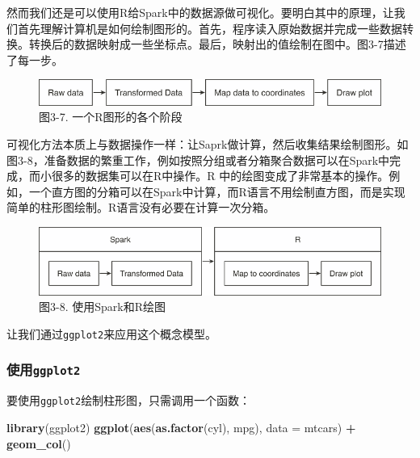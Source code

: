 \documentclass[
]{article}
\newenvironment{Shaded}{\begin{snugshade}}{\end{snugshade}}
\newcommand{\DataTypeTok}[1]{\textcolor[rgb]{0.13,0.29,0.53}{#1}}
\newcommand{\KeywordTok}[1]{\textcolor[rgb]{0.13,0.29,0.53}{\textbf{#1}}}
\newcommand{\NormalTok}[1]{#1}
\newcommand{\OperatorTok}[1]{\textcolor[rgb]{0.81,0.36,0.00}{\textbf{#1}}}
\newcommand{\StringTok}[1]{\textcolor[rgb]{0.31,0.60,0.02}{#1}}
\begin{document}
然而我们还是可以使用R给Spark中的数据源做可视化。要明白其中的原理，让我们首先理解计算机是如何绘制图形的。首先，程序读入原始数据并完成一些数据转换。转换后的数据映射成一些坐标点。最后，映射出的值绘制在图中。图3-7描述了每一步。

\begin{figure}
\centering
\includegraphics{figures/3_7.png}
\caption{图3-7. 一个R图形的各个阶段}
\end{figure}

可视化方法本质上与数据操作一样：让Saprk做计算，然后收集结果绘制图形。如图3-8，准备数据的繁重工作，例如按照分组或者分箱聚合数据可以在Spark中完成，而小很多的数据集可以在R中操作。R
中的绘图变成了非常基本的操作。例如，一个直方图的分箱可以在Spark中计算，而R语言不用绘制直方图，而是实现简单的柱形图绘制。R语言没有必要在计算一次分箱。

\begin{figure}
\centering
\includegraphics{figures/3_8.png}
\caption{图3-8. 使用Spark和R绘图}
\end{figure}

让我们通过\texttt{ggplot2}来应用这个概念模型。

\hypertarget{ux4f7fux7528ggplot2}{%
\subsubsection{\texorpdfstring{使用\texttt{ggplot2}}{使用ggplot2}}\label{ux4f7fux7528ggplot2}}

要使用\texttt{ggplot2}绘制柱形图，只需调用一个函数：

\begin{Shaded}
\begin{Highlighting}[]
\KeywordTok{library}\NormalTok{(ggplot2)}
\KeywordTok{ggplot}\NormalTok{(}\KeywordTok{aes}\NormalTok{(}\KeywordTok{as.factor}\NormalTok{(cyl), mpg), }\DataTypeTok{data =}\NormalTok{ mtcars) }\OperatorTok{+}\StringTok{ }\KeywordTok{geom_col}\NormalTok{()}
\end{Highlighting}
\end{Shaded}
\end{document}
